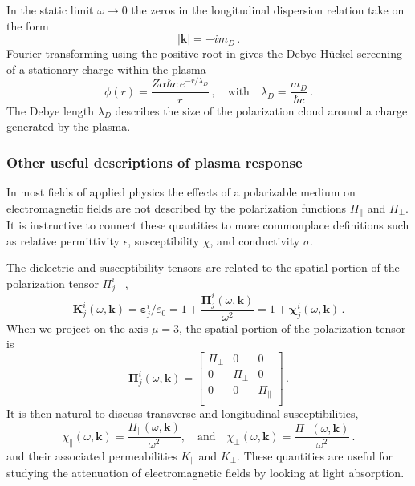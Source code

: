 In the static limit $\omega \rightarrow 0$ the zeros in the longitudinal dispersion relation take on the form
\begin{equation}
    |\mathbf{k}| = \pm  i m_D \,.
\end{equation}
Fourier transforming using the positive root in  gives the Debye-H\"uckel screening of a stationary charge within the plasma \cite{Debye:1923}
\begin{equation}
    \phi(r) = \frac{Z \alpha \hbar c \, e^{-r/\lambda_D}}{r}\,, \quad \text{with} \quad  \lambda_D = \frac{m_D}{\hbar c}\,.
\end{equation}
The Debye length $\lambda_D$ describes the size of the polarization cloud around a charge generated by the plasma.
\subsubsection{Other useful descriptions of plasma response}

In most fields of applied physics the effects of a polarizable medium on electromagnetic fields are not described by the polarization functions $\Pi_\parallel$ and $\Pi_\perp$. It is instructive to connect these quantities to more commonplace definitions such as relative permittivity $\epsilon$, susceptibility $\chi$, and conductivity $\sigma$.

The dielectric and susceptibility tensors are related to the spatial portion of the polarization tensor $\Pi^i_j$ ~\cite{Starke:2014tfa,melrose2008quantum},
\begin{equation}\label{dielten}
     \boldsymbol{K}^i_j(\omega,\boldsymbol{k}) = \boldsymbol{\varepsilon}^i_j/\varepsilon_0 = 1+\frac{\boldsymbol{\Pi}^i_j(\omega,\boldsymbol{k})}{\omega^2} = 1+\boldsymbol{\chi}^i_j(\omega,\boldsymbol{k})\,.
\end{equation}
When we project on the axis $\mu =3$, the spatial portion of the polarization tensor is
 \begin{equation}
    \boldsymbol{\Pi}^{i}_{j}(\omega,\boldsymbol{k}) = \left[
    \begin{array}{ccc}
  \Pi_{\perp} & 0 & 0 \\
  0 & \Pi_{\perp} & 0 \\
  0& 0 & \Pi_{\parallel} \\ 
\end{array}
\right]\,.
\end{equation}
It is then natural to discuss transverse and longitudinal susceptibilities,
\begin{equation}\label{eq:chi}
    \chi_\parallel(\omega,\boldsymbol{k}) =\frac{\Pi_\parallel(\omega,\boldsymbol{k})}{\omega^2}, \quad \text{and} \quad \chi_\perp(\omega,\boldsymbol{k}) = \frac{\Pi_\perp(\omega,\boldsymbol{k})}{\omega^2}\,.
\end{equation}
and their associated permeabilities $K_\parallel$ and $K_\perp$. These quantities are useful for studying the attenuation of electromagnetic fields by looking at light absorption.

